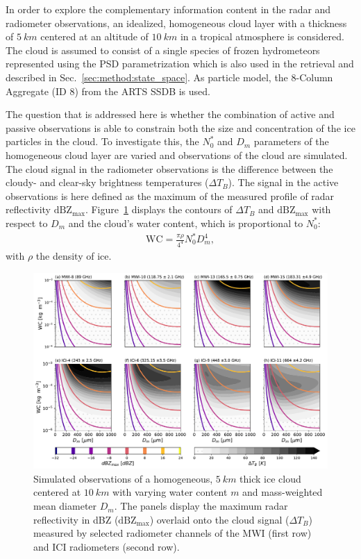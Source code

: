 \documentclass[journal abbreviation, manuscript]{copernicus}
\begin{document}
In order to explore the complementary information content in the radar and
radiometer observations, an idealized, homogeneous cloud layer with a thickness
of $5\ \unit{km}$ centered at an altitude of $10\ \unit{km}$ in a tropical
atmosphere is considered. The cloud is assumed to consist of a single species of
frozen hydrometeors represented using the PSD parametrization which is also used
in the retrieval and described in Sec.~\ref{sec:method:state_space}. As particle
model, the 8-Column Aggregate (ID 8) from the ARTS SSDB is used.

The question that is addressed here is whether the combination of active and
passive observations is able to constrain both the size and concentration of the
ice particles in the cloud. To investigate this, the $N_0^*$ and $D_m$
parameters of the homogeneous cloud layer are varied and observations of the
cloud are simulated. The cloud signal in the radiometer observations is the
difference between the cloudy- and clear-sky brightness temperatures ($\Delta
T_B$). The signal in the active observations is here defined as the maximum of
the measured profile of radar reflectivity $\text{dBZ}_\text{max}$.
Figure~\ref{fig:contours} displays the contours of $\Delta T_B$ and
$\text{dBZ}_\text{max}$ with respect to $D_m$ and the cloud's water content,
which is proportional to $N_0^*$:
\begin{align}
\text{WC} = \frac{\pi \rho}{4 ^ 4}N_0^* D_m^4,
\end{align}
with $\rho$ the density of ice.

\begin{figure}
\centering
\includegraphics[width = 1.0\textwidth]{../plots/contours}
\caption{Simulated observations of a homogeneous, $5\ \unit{km}$ thick ice cloud
  centered at $10\ \unit{km}$ with varying water content $m$ and
  mass-weighted mean diameter $D_m$. The panels display the maximum radar
  reflectivity in dBZ ($\text{dBZ}_\text{max}$) overlaid onto the cloud signal
  ($\Delta T_B$) measured by selected radiometer channels of the MWI (first row)
  and ICI radiometers (second row).}
\label{fig:contours}
\end{figure}
\end{document}
